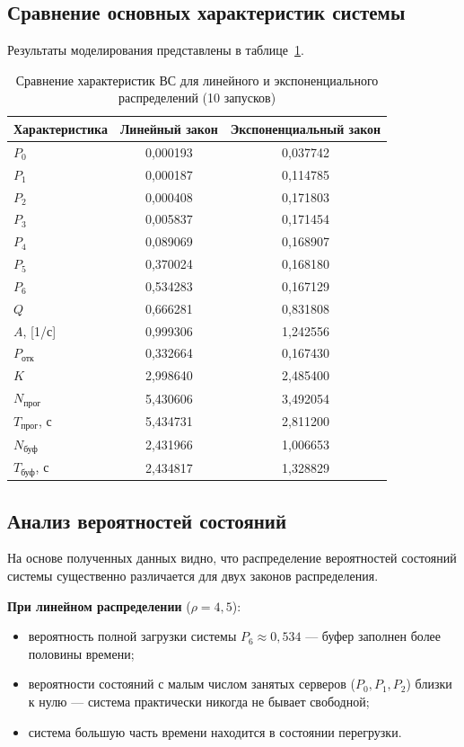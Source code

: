 \documentclass[14pt,a4paper]{extarticle}
\begin{document}
\subsection{Сравнение основных характеристик системы}

Результаты моделирования представлены в таблице~\ref{tab:compare}.

\begin{table}[H]
\centering
\caption{Сравнение характеристик ВС для линейного и экспоненциального распределений (10 запусков)}
\label{tab:compare}
\begin{tabular}{lcc}
\toprule
Характеристика & Линейный закон & Экспоненциальный закон \\
\midrule
$P_0$ & 0{,}000193 & 0{,}037742 \\
$P_1$ & 0{,}000187 & 0{,}114785 \\
$P_2$ & 0{,}000408 & 0{,}171803 \\
$P_3$ & 0{,}005837 & 0{,}171454 \\
$P_4$ & 0{,}089069 & 0{,}168907 \\
$P_5$ & 0{,}370024 & 0{,}168180 \\
$P_6$ & 0{,}534283 & 0{,}167129 \\
$Q$   & 0{,}666281 & 0{,}831808 \\
$A$, [1/с] & 0{,}999306 & 1{,}242556 \\
$P_{\text{отк}}$ & 0{,}332664 & 0{,}167430 \\
$K$   & 2{,}998640 & 2{,}485400 \\
$N_{\text{прог}}$ & 5{,}430606 & 3{,}492054 \\
$T_{\text{прог}}$, с & 5{,}434731 & 2{,}811200 \\
$N_{\text{буф}}$ & 2{,}431966 & 1{,}006653 \\
$T_{\text{буф}}$, с & 2{,}434817 & 1{,}328829 \\
\bottomrule
\end{tabular}
\end{table}

\subsection{Анализ вероятностей состояний}

На основе полученных данных видно, что распределение вероятностей состояний
системы существенно различается для двух законов распределения.

\textbf{При линейном распределении} ($\rho = 4{,}5$):
\begin{itemize}
  \item вероятность полной загрузки системы $P_6 \approx 0{,}534$ --- буфер
        заполнен более половины времени;
  \item вероятности состояний с малым числом занятых серверов
        ($P_0, P_1, P_2$) близки к нулю --- система практически никогда не
        бывает свободной;
  \item система большую часть времени находится в состоянии перегрузки.
\end{itemize}
\end{document}
